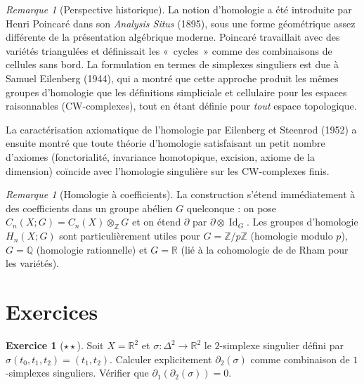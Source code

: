 \documentclass[12pt,a4paper,openany]{book}
\theoremstyle{definition}
\newtheorem{exercice}{Exercice}[chapter]
\theoremstyle{plain}
\theoremstyle{remark}
\newtheorem{remarque}[definition]{Remarque}
\newcommand{\Z}{\mathbb{Z}}
\newcommand{\Q}{\mathbb{Q}}
\newcommand{\R}{\mathbb{R}}
\DeclareMathOperator{\Id}{Id}
\begin{document}
\begin{remarque}[Perspective historique]\label{rem:histoire-homologie}
La notion d'homologie a été introduite par Henri Poincaré dans son \emph{Analysis Situs} (1895),
sous une forme géométrique assez différente de la présentation algébrique moderne. Poincaré
travaillait avec des variétés triangulées et définissait les «~cycles~» comme des combinaisons
de cellules sans bord. La formulation en termes de simplexes singuliers est due à Samuel Eilenberg
(1944), qui a montré que cette approche produit les mêmes groupes d'homologie que les définitions
simpliciale et cellulaire pour les espaces raisonnables (CW-complexes), tout en étant
définie pour \emph{tout} espace topologique.

La caractérisation axiomatique de l'homologie par Eilenberg et Steenrod (1952) a ensuite montré
que toute théorie d'homologie satisfaisant un petit nombre d'axiomes (fonctorialité, invariance
homotopique, excision, axiome de la dimension) coïncide avec l'homologie singulière sur les
CW-complexes finis.
\end{remarque}

\begin{remarque}[Homologie à coefficients]\label{rem:homologie-coefficients}
La construction s'étend immédiatement à des coefficients dans un groupe abélien $G$ quelconque :
on pose $C_n(X; G) = C_n(X) \otimes_\Z G$ et on étend $\partial$ par $\partial \otimes \Id_G$.
Les groupes d'homologie $H_n(X; G)$ sont particulièrement utiles pour $G = \Z/p\Z$
(homologie modulo $p$), $G = \Q$ (homologie rationnelle) et $G = \R$ (lié à la cohomologie
de de Rham pour les variétés).
\end{remarque}

\section{Exercices}\label{sec:exo-ch5}

\begin{exercice}[$\star\star$]\label{exo:bord-explicite}
Soit $X = \R^2$ et $\sigma \colon \Delta^2 \to \R^2$ le $2$-simplexe singulier défini par
$\sigma(t_0, t_1, t_2) = (t_1, t_2)$. Calculer explicitement $\partial_2(\sigma)$ comme
combinaison de $1$-simplexes singuliers. Vérifier que $\partial_1(\partial_2(\sigma)) = 0$.
\end{exercice}
\end{document}
